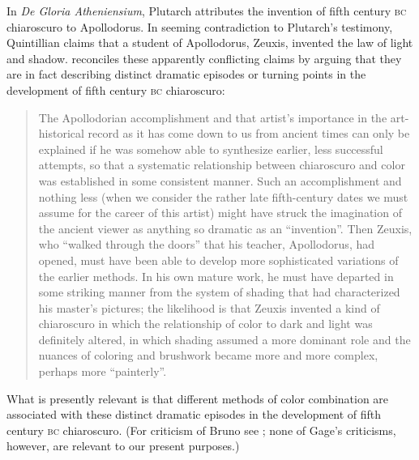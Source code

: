 In \emph{De Gloria Atheniensium}, Plutarch attributes the invention of fifth century \textsc{bc} chiaroscuro to Apollodorus. In seeming contradiction to Plutarch's testimony, Quintillian claims that a student of Apollodorus, Zeuxis, invented the law of light and shadow. \citet[27--29]{Bruno:1977fk} reconciles these apparently conflicting claims by arguing that they are in fact describing distinct dramatic episodes or turning points in the development of fifth century \textsc{bc} chiaroscuro:
\begin{quote}
    The Apollodorian accomplishment and that artist's importance in the art-historical record as it has come down to us from ancient times can only be explained if he was somehow able to synthesize earlier, less successful attempts, so that a systematic relationship between chiaroscuro and color was established in some consistent manner. Such an accomplishment and nothing less (when we consider the rather late fifth-century dates we must assume for the career of this artist) might have struck the imagination of the ancient viewer as anything so dramatic as an ``invention''. Then Zeuxis, who ``walked through the doors'' that his teacher, Apollodorus, had opened, must have been able to develop more sophisticated variations of the earlier methods. In his own mature work, he must have departed in some striking manner from the system of shading that had characterized his master's pictures; the likelihood is that Zeuxis invented a kind of chiaroscuro in which the relationship of color to dark and light was definitely altered, in which shading assumed a more dominant role and the nuances of coloring and brushwork became more and more complex, perhaps more ``painterly''. \citep[29]{Bruno:1977fk}
\end{quote}
What is presently relevant is that different methods of color combination are associated with these distinct dramatic episodes in the development of fifth century \textsc{bc} chiaroscuro. (For criticism of Bruno see \citealt{Gage:1993aa}; none of Gage's criticisms, however, are relevant to our present purposes.)

